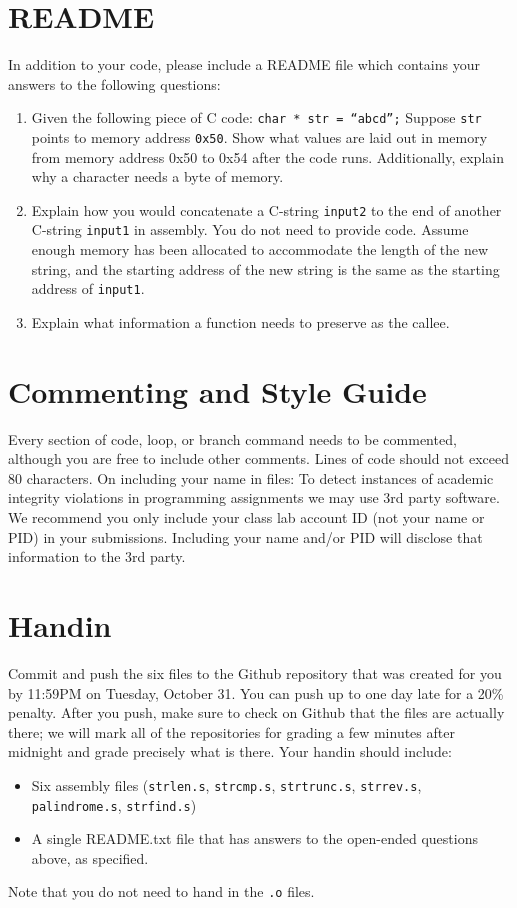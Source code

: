 \documentclass{article}
\begin{document}
\section{README}
In addition to your code, please include a README file which contains your
answers to the following questions:
\begin{enumerate}
\item Given the following piece of C code: {\tt char * str = ``abcd'';} \newline Suppose {\tt str} points to memory address {\tt 0x50}. Show what values are laid out in memory from memory address 0x50 to 0x54 after the code runs. Additionally, explain why a character needs a byte of memory.
\item Explain how you would concatenate a C-string {\tt input2} to the end of another C-string {\tt input1} in assembly. You do not need to provide code. Assume enough memory has been allocated to accommodate the length of the new string, and the starting address of the new string is the same as the starting address of {\tt input1}.
\item Explain what information a function needs to preserve as the callee.  
\end{enumerate}
\section{Commenting and Style Guide}
Every section of code, loop, or branch command needs to be commented, although
you are free to include other comments. Lines of code should not exceed 80
characters.
On including your name in files: To detect instances of academic integrity
violations in programming assignments we may use 3rd party software.  We
recommend you only include your class lab account ID (not your name or PID) in
your submissions.  Including your name and/or PID will disclose that
information to the 3rd party.
\section{Handin}
Commit and push the six files to the Github repository that was created
for you by 11:59PM on Tuesday, October 31. You can push up to one day late for
a 20\% penalty. After you push, make sure to check on Github that the files are
actually there; we will mark all of the repositories for grading a few minutes
after midnight and grade precisely what is there.
Your handin should include:
\begin{itemize}
\item Six assembly files ({\tt strlen.s}, {\tt strcmp.s}, {\tt strtrunc.s}, {\tt strrev.s}, {\tt palindrome.s}, {\tt strfind.s})
\item A single README.txt file that has answers to the open-ended questions
above, as specified.
\end{itemize}
Note that you do not need to hand in the {\tt .o} files.
\end{document}
